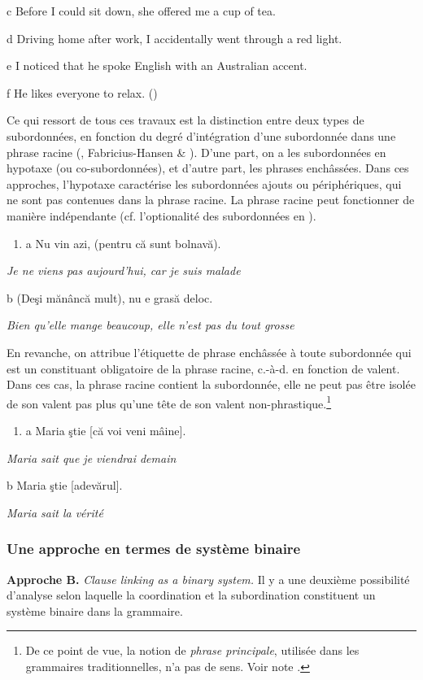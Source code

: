   c  Before I could sit down, she offered me a cup of tea.

  d  Driving home after work, I accidentally went through a red light.

  e  I noticed that he spoke English with an Australian accent.

  f  He likes everyone to relax.            (\citet[111]{Cosme2008})

Ce qui ressort de tous ces travaux est la distinction entre deux types de subordonnées, en fonction du degré d'intégration d'une subordonnée dans une phrase racine (\citet{Aarts2006}, Fabricius-Hansen \& \citet{Ramm2008}). D'une part, on a les subordonnées en hypotaxe (ou co-subordonnées), et d'autre part, les phrases enchâssées. Dans ces approches, l'hypotaxe caractérise les subordonnées ajouts ou périphériques, qui ne sont pas contenues dans la phrase racine. La phrase racine peut fonctionner de manière indépendante (cf. l'optionalité des subordonnées en ).


\begin{enumerate}
\item \label{bkm:Ref300156807}a  Nu vin azi, (pentru că sunt bolnavă).


\end{enumerate}
{\itshape
Je ne viens pas aujourd'hui, car je suis malade}

  b  (Deşi mănâncă mult), nu e grasă deloc.

    \textit{Bien qu'elle mange beaucoup, elle n'est pas du tout grosse}

En revanche, on attribue l'étiquette de phrase enchâssée à toute subordonnée qui est un constituant obligatoire de la phrase racine, c.-à-d. en fonction de valent. Dans ces cas, la phrase racine contient la subordonnée, elle ne peut pas être isolée de son valent pas plus qu'une tête de son valent non-phrastique.\footnote{De ce point de vue, la notion de \textit{phrase principale}, utilisée dans les grammaires traditionnelles, n'a pas de sens. Voir note \pageref{fnt:ftn0}.}


\begin{enumerate}
\item a  Maria ştie [că voi veni mâine].


\end{enumerate}
{\itshape
Maria sait que je viendrai demain}

b   Maria ştie [adevărul].

  \textit{Maria sait la vérité}

\subsubsection{Une approche en termes de système binaire}
\textbf{Approche B.} \textit{Clause linking as a binary system.} Il y a une deuxième possibilité d'analyse selon laquelle la coordination et la subordination constituent un système binaire dans la grammaire. 

